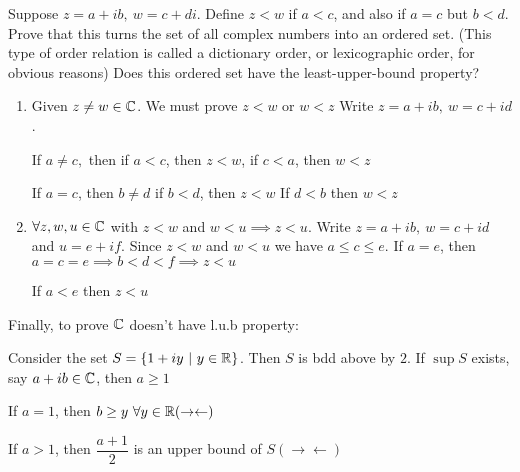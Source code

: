 Suppose $z = a + ib,~w = c+di$. Define $z < w$ if $a<c$, and also if $a=c$ but $b<d$. Prove that this turns the set of all complex numbers into an ordered set. (This type of order relation is called a dictionary order, or lexicographic order, for obvious reasons) Does this ordered set have the least-upper-bound property?

\begin{tcolorbox}
	\begin{solution}
		\begin{enumerate}
			\item Given $z \neq w \in \mathbb{C}$. We must prove $z < w$ or $w < z$ Write $z = a+ib,~w=c+id$.
			
			If $a \neq c,$ then if $a<c$, then $z < w$, if $c < a$, then $w < z$
			
			If $a = c$, then $b \neq d$ if $b<d$, then $z<w$ If $d < b$ then $w < z$
			
			\item $\forall z,w,u \in \mathbb{C}$ with $z < w$ and $w<u \implies z < u$. Write $z = a+ib,~w=c+id$ and $u = e+if$. Since $z < w$ and $w<u$ we have $a \leq c \leq e$. If $a = e$, then $a = c = e \implies b < d < f \implies z < u$
			
			If $a < e$ then $z < u$
		\end{enumerate}
		
		Finally, to prove $\mathbb{C}$ doesn't have l.u.b property:
		
		Consider the set $S = \{1 + iy ~|~ y \in \mathbb{R}\}$. Then $S$ is bdd above by $2$. If $\sup S$ exists, say $a + ib \in \mathbb{C}$, then $a \geq 1$
		
		If $a = 1$, then $b \geq y ~\forall y \in \mathbb{R} (\rightarrow\leftarrow)$
		
		If $a>1$, then $\dfrac{a+1}{2}$ is an upper bound of $S (\rightarrow\leftarrow)$
	\end{solution}
\end{tcolorbox}










